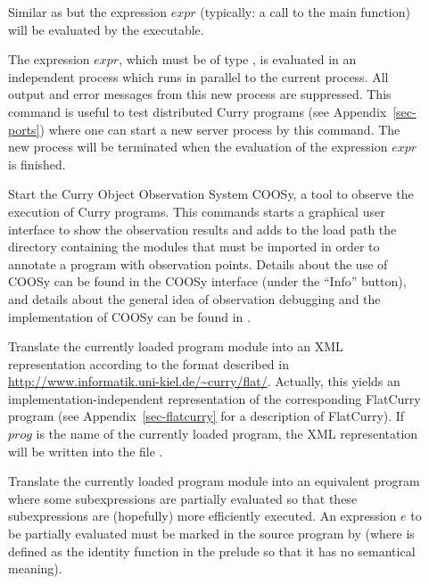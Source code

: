 \begin{description}
\item[] Similar as 
but the expression $expr$ (typically: a call to the main
function) will be evaluated by the executable.

\item[]
The expression $expr$, which must be of type ,
is evaluated in an independent process which runs in
parallel to the current \CYS process.
All output and error messages from this new process are suppressed.
This command is useful to test distributed Curry programs
(see Appendix~\ref{sec-ports}) where one can start
a new server process by this command. The new process
will be terminated when the evaluation of the expression $expr$
is finished.

\item[]
Start the Curry Object Observation System COOSy,
a tool to observe the execution of Curry programs.
This commands starts a graphical user interface to show
the observation results and adds to the load path the directory
containing the modules that must be imported in order to annotate
a program with observation points.
Details about the use of COOSy can be found in the
COOSy interface (under the ``Info'' button), and details
about the general idea of observation debugging and the implementation
of COOSy can be found in \cite{BrasselChitilHanusHuch04PADL}.

\item[]
Translate the currently loaded program module into an XML representation
according to the format described in
\url{http://www.informatik.uni-kiel.de/~curry/flat/}.
Actually, this yields an implementation-independent
representation of the corresponding FlatCurry program
(see Appendix~\ref{sec-flatcurry} for a description of FlatCurry).
If $prog$ is the name of the currently loaded program,
the XML representation will be written into the file .

\item[]
Translate the currently loaded program module into an equivalent
program where some subexpressions are partially evaluated
so that these subexpressions are (hopefully) more efficiently executed.
An expression $e$ to be partially evaluated
must be marked in the source program by 
(where  is defined as the identity function in the prelude
so that it has no semantical meaning).


\end{description}
